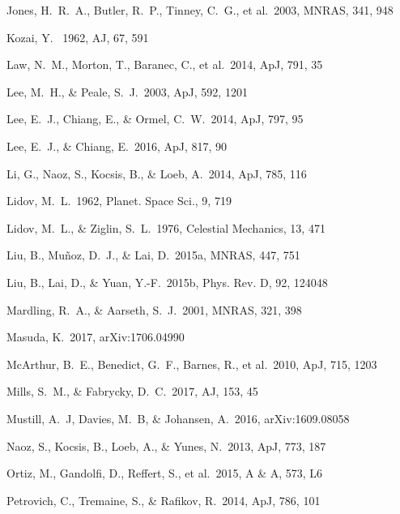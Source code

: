 \documentclass[12pt,useAMS, usenatbib]{mn2e}
\begin{document}
\begin{thebibliography}{}
Jones, H.~R.~A., Butler, R.~P., Tinney, C.~G., et al.\ 2003, MNRAS, 341, 948

Kozai, Y.  \ 1962, AJ, 67, 591

Law, N.~M., Morton, T., Baranec, C., et al.\ 2014, ApJ, 791, 35

Lee, M.~H., \& Peale, S.~J.\ 2003, ApJ, 592, 1201

Lee, E.~J., Chiang, E., \& Ormel, C.~W.\ 2014, ApJ, 797, 95

Lee, E.~J., \& Chiang, E.\ 2016, ApJ, 817, 90

Li, G., Naoz, S., Kocsis, B., \& Loeb, A.\ 2014, ApJ, 785, 116 

Lidov, M.~L.\ 1962, Planet. Space Sci., 9, 719

Lidov, M.~L., \& Ziglin, S.~L.\ 1976, Celestial Mechanics, 13, 471

Liu, B., Mu{\~n}oz, D.~J., \& Lai, D.\ 2015a, MNRAS, 447, 751

Liu, B., Lai, D., \& Yuan, Y.-F.\ 2015b, Phys. Rev. D, 92, 124048

Mardling, R.~A., \& Aarseth, S.~J.\ 2001, MNRAS, 321, 398

Masuda, K.\ 2017, arXiv:1706.04990

McArthur, B.~E., Benedict, G.~F., Barnes, R., et al.\ 2010, ApJ, 715, 1203

Mills, S.~M., \& Fabrycky, D.~C.\ 2017, AJ, 153, 45 

Mustill, A.~J, Davies, M.~B, \& Johansen, A.\ 2016, arXiv:1609.08058

Naoz, S., Kocsis, B., Loeb, A., \& Yunes, N.\ 2013, ApJ, 773, 187

Ortiz, M., Gandolfi, D., Reffert, S., et al.\ 2015, A \& A, 573, L6

Petrovich, C., Tremaine, S., \& Rafikov, R.\ 2014, ApJ, 786, 101


\end{thebibliography}
\end{document}
